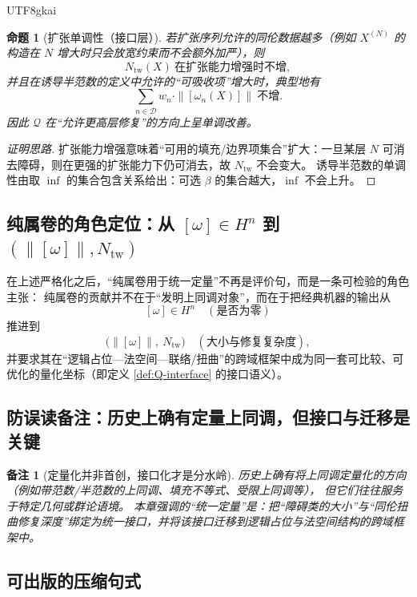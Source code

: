 \documentclass[12pt]{article}
\newtheorem{proposition}{命题}[section]
\newtheorem{remark}{备注}[section]
\begin{document}
\begin{CJK*}{UTF8}{gkai}
\begin{proposition}[扩张单调性（接口层）]\label{prop:Q-monotone}
若扩张序列允许的同伦数据越多（例如 $X^{(N)}$ 的构造在 $N$ 增大时只会放宽约束而不会额外加严），则
\[
  N_{\mathrm{tw}}(X)\ \text{在扩张能力增强时不增},
\]
并且在诱导半范数的定义中允许的“可吸收项”增大时，典型地有
\[
  \sum_{n\in\mathcal{D}} w_n\cdot \|[\omega_n(X)]\|\ \text{不增}.
\]
因此 $\mathcal{Q}$ 在“允许更高层修复”的方向上呈单调改善。
\end{proposition}

\begin{proof}[证明思路]
扩张能力增强意味着“可用的填充/边界项集合”扩大：一旦某层 $N$ 可消去障碍，则在更强的扩张能力下仍可消去，故 $N_{\mathrm{tw}}$ 不会变大。
诱导半范数的单调性由取 $\inf$ 的集合包含关系给出：可选 $\beta$ 的集合越大，$\inf$ 不会上升。
\end{proof}

\subsection{纯属卷的角色定位：从 $[\omega]\in H^n$ 到 $(\|[\omega]\|,N_{\mathrm{tw}})$}

在上述严格化之后，“纯属卷用于统一定量”不再是评价句，而是一条可检验的角色主张：
纯属卷的贡献并不在于“发明上同调对象”，而在于把经典机器的输出从
\[
  [\omega]\in H^n \quad (\text{是否为零})
\]
推进到
\[
  \bigl(\|[\omega]\|,\ N_{\mathrm{tw}}\bigr)\quad (\text{大小与修复复杂度}),
\]
并要求其在“逻辑占位—法空间—联络/扭曲”的跨域框架中成为同一套可比较、可优化的量化坐标（即定义 \ref{def:Q-interface} 的接口语义）。

\subsection{防误读备注：历史上确有定量上同调，但接口与迁移是关键}

\begin{remark}[定量化并非首创，接口化才是分水岭]
历史上确有将上同调定量化的方向（例如带范数/半范数的上同调、填充不等式、受限上同调等），
但它们往往服务于特定几何或群论语境。
本章强调的“统一定量”是：把“障碍类的大小”与“同伦扭曲修复深度”绑定为统一接口，并将该接口迁移到逻辑占位与法空间结构的跨域框架中。
\end{remark}

\subsection{可出版的压缩句式}


\end{CJK*}
\end{document}
